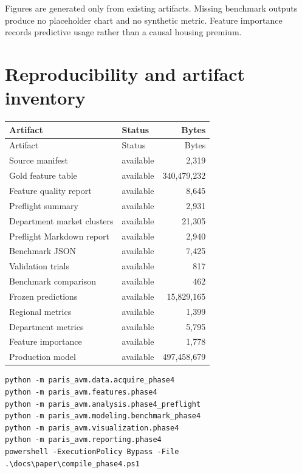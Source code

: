 \documentclass[11pt,a4paper]{article}
\begin{document}
Figures are generated only from existing artifacts. Missing benchmark outputs
produce no placeholder chart and no synthetic metric. Feature importance records
predictive usage rather than a causal housing premium.

\section{Reproducibility and artifact inventory}

\begin{longtable}{p{5.8cm}lr}
\toprule
Artifact & Status & Bytes \\
\midrule
\endfirsthead
\toprule Artifact & Status & Bytes \\
\midrule
\endhead
Source manifest & available & 2,319 \\
Gold feature table & available & 340,479,232 \\
Feature quality report & available & 8,645 \\
Preflight summary & available & 2,931 \\
Department market clusters & available & 21,305 \\
Preflight Markdown report & available & 2,940 \\
Benchmark JSON & available & 7,425 \\
Validation trials & available & 817 \\
Benchmark comparison & available & 462 \\
Frozen predictions & available & 15,829,165 \\
Regional metrics & available & 1,399 \\
Department metrics & available & 5,795 \\
Feature importance & available & 1,778 \\
Production model & available & 497,458,679 \\
\bottomrule
\end{longtable}

\begin{minipage}{\textwidth}
\small
\begin{verbatim}
python -m paris_avm.data.acquire_phase4
python -m paris_avm.features.phase4
python -m paris_avm.analysis.phase4_preflight
python -m paris_avm.modeling.benchmark_phase4
python -m paris_avm.visualization.phase4
python -m paris_avm.reporting.phase4
powershell -ExecutionPolicy Bypass -File .\docs\paper\compile_phase4.ps1
\end{verbatim}
\end{minipage}
\end{document}
